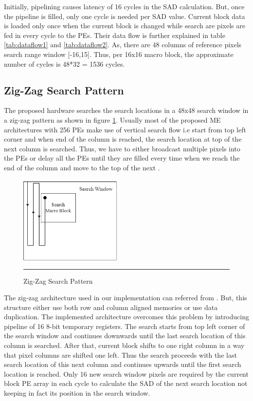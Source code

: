 Initially, pipelining causes latency of 16 cycles in the SAD calculation. But, once the pipeline is filled, only one cycle is needed per SAD value. Current block data is loaded only once when the current block is changed while search are pixels are fed in every cycle to the PEs. Their data flow is further explained in table \ref{tab:dataflow1} and \ref{tab:dataflow2}. As, there are 48 columns of reference pixels search range window [-16,15]. Thus, per 16x16 macro block, the approximate number of cycles is 48*32 = 1536 cycles. 

\subsection{Zig-Zag Search Pattern}

The proposed hardware searches the search locations in a 48x48 search window in a zig-zag pattern as shown in figure \ref{fig:zigzag}. Usually most of the proposed ME architectures with 256 PEs make use of vertical search flow i.e start from top left corner and when end of the column is reached, the search location at top of the next column is searched. Thus, 
we have to either broadcast multiple pixels into the PEs or delay all the PEs until they are filled every time when we reach the end of the column and move to the top of the next \cite{hardware_architecture_design}.

\begin{figure}[htbp]
	\centering
	\includegraphics[width = 2in]{./Figures/zigzag.png}
	\rule{35em}{0.5pt}
	\caption{Zig-Zag Search Pattern}
	\label{fig:zigzag}
\end{figure}

The zig-zag architecture used in our implementation can referred from \cite{fast_vlsi_architecture}. But, this structure either use both row and column aligned memories or use data duplication. The implemented architecture overcomes this problem by introducing pipeline of 16 8-bit temporary registers. The search starts from top left corner of the search window and continues downwards until the last search location of this column is searched. After that, current block shifts to one right column in a way that pixel columns are shifted one left. Thus the search proceeds with the last search location of this next column and continues upwards until the first search location is reached. Only 16 new search window pixels are required by the current block PE array in each cycle to calculate the SAD of the next search location not keeping in fact its position in the search window. 


